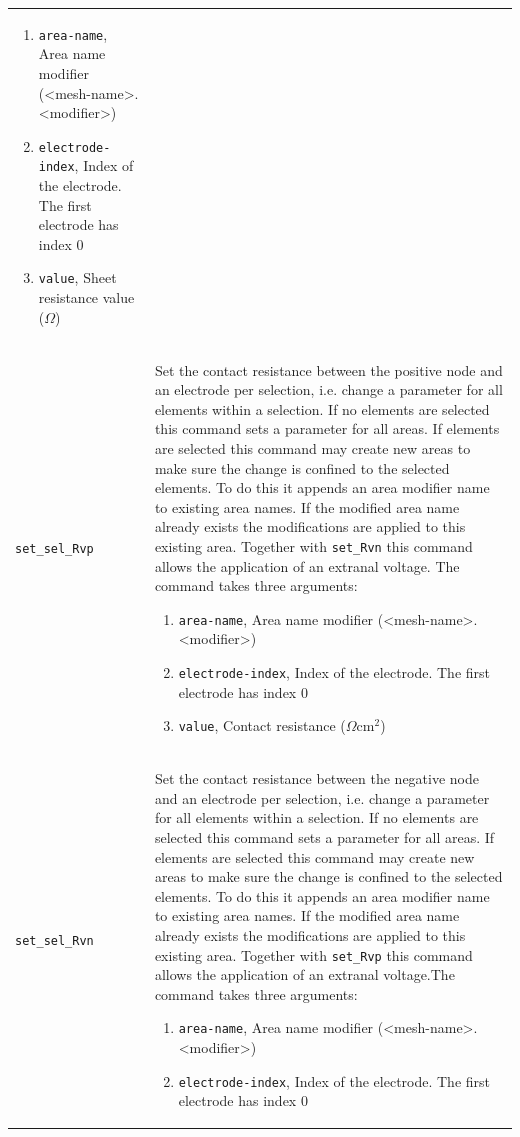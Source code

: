 \documentclass[noshowpacs,preprintnumbers,amsmath,amssymb, letter]{revtex4}
\begin{document}
\begin{longtable}{p{}p{}}
\begin{enumerate}
\item \texttt{area-name}, Area name modifier (\textless mesh-name\textgreater .\textless modifier\textgreater )
\item \texttt{electrode-index}, Index of the electrode. The first electrode has index 0
\item \texttt{value}, Sheet resistance value ($\Omega$)
\end{enumerate}\\
\texttt{set\_sel\_Rvp}	&  Set the contact resistance between the positive node and an electrode per selection, i.e. change a parameter for all elements within a selection. If no elements are selected this command sets a parameter for all areas. If elements are selected this command may create new areas to make sure the change is confined to the selected elements. To do this it appends an area modifier name to existing area names. If the modified area name already exists the modifications are applied to this existing area. Together with \texttt{set\_Rvn} this command allows the application of an extranal voltage. The command takes three arguments:
\begin{enumerate}
\item \texttt{area-name}, Area name modifier (\textless mesh-name\textgreater .\textless modifier\textgreater )
\item \texttt{electrode-index}, Index of the electrode. The first electrode has index 0
\item \texttt{value}, Contact resistance ($\Omega \text{cm}^2$)
\end{enumerate}\\
\texttt{set\_sel\_Rvn}	&  Set the contact resistance between the negative node and an electrode per selection, i.e. change a parameter for all elements within a selection. If no elements are selected this command sets a parameter for all areas. If elements are selected this command may create new areas to make sure the change is confined to the selected elements. To do this it appends an area modifier name to existing area names. If the modified area name already exists the modifications are applied to this existing area. Together with \texttt{set\_Rvp} this command allows the application of an extranal voltage.The command takes three arguments:
\begin{enumerate}
\item \texttt{area-name}, Area name modifier (\textless mesh-name\textgreater .\textless modifier\textgreater )
\item \texttt{electrode-index}, Index of the electrode. The first electrode has index 0

\end{enumerate}
\end{longtable}
\end{document}
